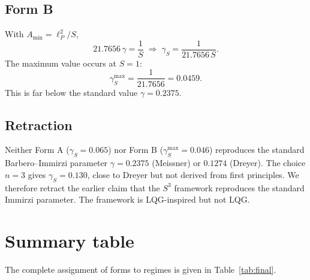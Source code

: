 \documentclass[a4paper,1pt,oneside,openany]{book}
\begin{document}
\subsection{Form B}

With $A_{\text{min}}=\ell_{P}^{2}/S$,
\begin{equation}
21.7656\,\gamma=\frac{1}{S}
\;\Longrightarrow\;
\gamma_{S}=\frac{1}{21.7656\,S}.
\label{eq:gamma-B}
\end{equation}
The maximum value occurs at $S=1$:
\begin{equation}
\gamma_{S}^{\max}=\frac{1}{21.7656}=0.0459.
\label{eq:gamma-Bmax}
\end{equation}
This is far below the standard value $\gamma=0.2375$.

\subsection{Retraction}

Neither Form A ($\gamma_{S}=0.065$) nor Form B 
($\gamma_{S}^{\max}=0.046$) reproduces the standard 
Barbero--Immirzi parameter $\gamma=0.2375$ (Meissner) or 
$0.1274$ (Dreyer). The choice $n=3$ gives $\gamma_{S}=0.130$, 
close to Dreyer but not derived from first principles. We 
therefore retract the earlier claim that the $S^{3}$ framework 
reproduces the standard Immirzi parameter. The framework is 
LQG-inspired but not LQG.

\section{Summary table}

The complete assignment of forms to regimes is given in 
Table~\ref{tab:final}.
\end{document}
